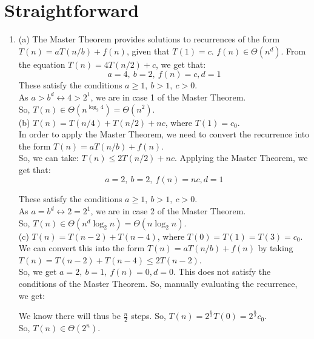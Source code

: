 \documentclass[a4paper]{article}
\begin{document}
\section{Straightforward}
\begin{enumerate}
    \item (a) The Master Theorem provides solutions to recurrences of the form $T(n) = aT(n/b) + f(n)$, given that $T(1) = c$. $f(n) \in \Theta (n^d)$. From the equation $T(n) = 4T(n/2) + c$, we get that:\\
    $$a = 4,\ b = 2,\ f(n) = c, d = 1$$
    These satisfy the conditions $a \geq 1,\ b > 1,\ c > 0$. \\
    As $a > b^d \leftrightarrow 4 > 2^1$, we are in case 1 of the Master Theorem.\\
    So, $T(n) \in \Theta(n^{\log_2 4}) = \Theta(n^2)$.\\

    (b) $T(n) = T(n/4) + T(n/2) + nc$, where $T(1) = c_0$. \\
    In order to apply the Master Theorem, we need to convert the recurrence into the form $T(n) = aT(n/b) + f(n)$.\\

    So, we can take: $T(n) \leq 2T(n/2) + nc$. Applying the Master Theorem, we get that:
    $$a = 2,\ b = 2,\ f(n) = nc, d = 1$$

    These satisfy the conditions $a \geq 1,\ b > 1,\ c > 0$. \\

    As $a = b^d \leftrightarrow 2 = 2^1$, we are in case 2 of the Master Theorem.\\

    So, $T(n) \in \Theta(n^d \log_2 n) = \Theta(n \log_2 n)$.\\


    (c) $T(n) = T(n-2) + T(n-4)$, where $T(0) = T(1) = T(3) = c_0$.\\
    We can convert this into the form $T(n) = aT(n/b) + f(n)$ by taking $T(n) = T(n-2) + T(n-4) \leq 2T(n-2)$.\\

    So, we get $a = 2,\ b = 1,\ f(n) = 0, d = 0$. This does not satisfy the conditions of the Master Theorem. So, manually evaluating the recurrence, we get:
We know there will thus be $\frac{n}{2}$ steps. So, $T(n) = 2^{\frac{n}{2}}T(0) = 2^{\frac{n}{2}}c_0$.\\
So, $T(n) \in \Theta(2^n)$.\\


\end{enumerate}
\end{document}
